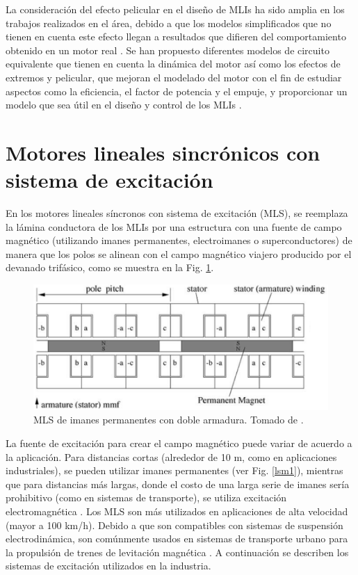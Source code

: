La consideración del efecto pelicular en el diseño de MLIs ha sido amplia en los trabajos realizados en el área, debido a que los modelos simplificados que no tienen en cuenta este efecto llegan a resultados que difieren del comportamiento obtenido en un motor real \cite{gieras1986}. Se han propuesto diferentes modelos de circuito equivalente que tienen en cuenta la dinámica del motor así como los efectos de extremos y pelicular, que mejoran el modelado del motor con el fin de estudiar aspectos como la eficiencia, el factor de potencia y el empuje, y proporcionar un modelo que sea útil en el diseño y control de los MLIs \cite{weixu2007,weixu2008,weixu2009,dong2014}.

\section{Motores lineales sincrónicos con sistema de excitación}
En los motores lineales síncronos con sistema de excitación (MLS), se reemplaza la lámina conductora de los MLIs por una estructura con una fuente de campo magnético (utilizando imanes permanentes, electroimanes o superconductores) de manera que los polos se alinean con el campo magnético viajero producido por el devanado trifásico, como se muestra en la Fig. \ref{lsm2}.

\begin{figure}[hbtp]
\centering
\includegraphics[scale=0.6]{../img/lsm2.PNG}
\caption{MLS de imanes permanentes con doble armadura. Tomado de \cite{stumberger2004}.}
\label{lsm2}
\end{figure}

La fuente de excitación para crear el campo magnético puede variar de acuerdo a la aplicación. Para distancias cortas (alrededor de 10 m, como en aplicaciones industriales), se pueden utilizar imanes permanentes (ver Fig. \ref{lsm1}), mientras que para distancias más largas, donde el costo de una larga serie de imanes sería prohibitivo (como en sistemas de transporte), se utiliza excitación electromagnética \cite{gieras2000}. Los MLS son más utilizados en aplicaciones de alta velocidad (mayor a 100 km/h). Debido a que son compatibles con sistemas de suspensión electrodinámica, son comúnmente usados en sistemas de transporte urbano para la propulsión de trenes de levitación magnética \cite{boldea2013,leekimlee2006}.  A continuación se describen los sistemas de excitación utilizados en la industria.

